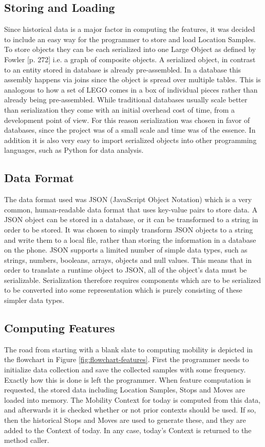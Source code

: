 \subsection{Storing and Loading}
Since historical data is a major factor in computing the features, it was decided to include an easy way for the programmer to store and load Location Samples. To store objects they can be each serialized into one Large Object as defined by Fowler \cite{fowler-PEEA} [p. 272] i.e. a graph of composite objects. A serialized object, in contrast to an entity stored in database is already pre-assembled. In a database this assembly happens via joins since the object is spread over multiple tables. This is analogous to how a set of LEGO comes in a box of individual pieces rather than already being pre-assembled. While traditional databases usually scale better than serialization they come with an initial overhead cost of time, from a development point of view. For this reason serialization was chosen in favor of databases,  since the project was of a small scale and time was of the essence. In addition it is also very easy to import serialized objects into other programming languages, such as Python for data analysis. 

\subsection{Data Format}
The data format used was JSON (JavaScript Object Notation) which is a very common, human-readable data format that uses key-value pairs to store data. A JSON object can be stored in a database, or it can be transformed to a string in order to be stored. It was chosen to simply transform JSON objects to a string and write them to a local file, rather than storing the information in a database on the phone. JSON supports a limited number of simple data types, such as strings, numbers, booleans, arrays, objects and null values. This means that in order to translate a runtime object to JSON, all of the object's data must be serializable. Serialization therefore requires components which are to be serialized to be converted into some representation which is purely consisting of these simpler data types.

\subsection{Computing Features}
The road from starting with a blank slate to computing mobility is depicted in the flowchart in Figure \ref{fig:flowchart-features}. First the programmer needs to initialize data collection and save the collected samples with some frequency. Exactly how this is done is left the programmer. When feature computation is requested, the stored data including Location Samples, Stops and Moves are loaded into memory. The Mobility Context for today is computed from this data, and afterwards it is checked whether or not prior contexts should be used. If so, then the historical Stops and Moves are used to generate these, and they are added to the Context of today. In any case, today's Context is returned to the method caller.

